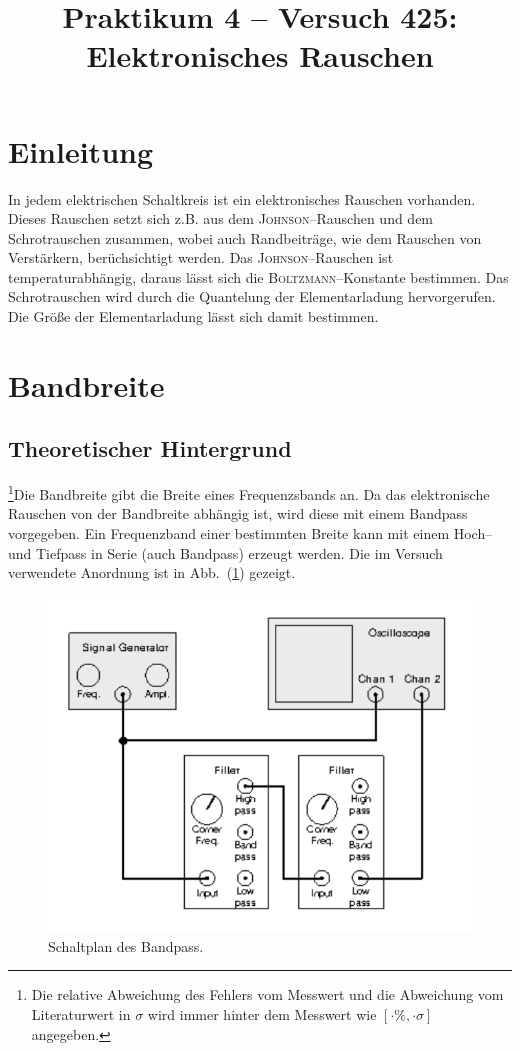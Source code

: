 \documentclass[sn-mathphys-num,iicol]{sn-jnl}
\theoremstyle{thmstyleone}
\theoremstyle{thmstyletwo}
\theoremstyle{thmstylethree}
\begin{document}
\title[]{Praktikum 4 -- Versuch 425: Elektronisches Rauschen}
\author*[1]{ }
\author*[1]{ }

\maketitle

\section{Einleitung}
In jedem elektrischen Schaltkreis ist ein elektronisches Rauschen vorhanden.
Dieses Rauschen setzt sich z.B. aus dem \textsc{Johnson}--Rauschen und dem Schrotrauschen zusammen, wobei auch Randbeiträge, wie dem Rauschen von Verstärkern, berüchsichtigt werden.
Das \textsc{Johnson}--Rauschen ist temperaturabhängig, daraus lässt sich die \textsc{Boltzmann}--Konstante bestimmen.
Das Schrotrauschen wird durch die Quantelung der Elementarladung hervorgerufen.
Die Größe der Elementarladung lässt sich damit bestimmen.

\section{Bandbreite}
\subsection{Theoretischer Hintergrund}
\footnote{Die relative Abweichung des Fehlers vom Messwert und die Abweichung vom Literaturwert in $\sigma $ wird immer hinter dem Messwert wie $[\cdot \%,\cdot \sigma ]$ angegeben.}Die Bandbreite gibt die Breite eines Frequenzsbands an.
Da das elektronische Rauschen von der Bandbreite abhängig ist, wird diese mit einem Bandpass vorgegeben.
Ein Frequenzband einer bestimmten Breite kann mit einem Hoch-- und Tiefpass in Serie (auch Bandpass) erzeugt werden.
Die im Versuch verwendete Anordnung ist in Abb.\ (\ref{fig:schaltplan_bandpass}) gezeigt.

\begin{figure}[t]
	\centering
	\includegraphics[width=.5\textwidth]{425_schaltplan_bandpass.png}
	\caption{Schaltplan des Bandpass.\cite{anleitung425}} \label{fig:schaltplan_bandpass}
\end{figure}
\end{document}
